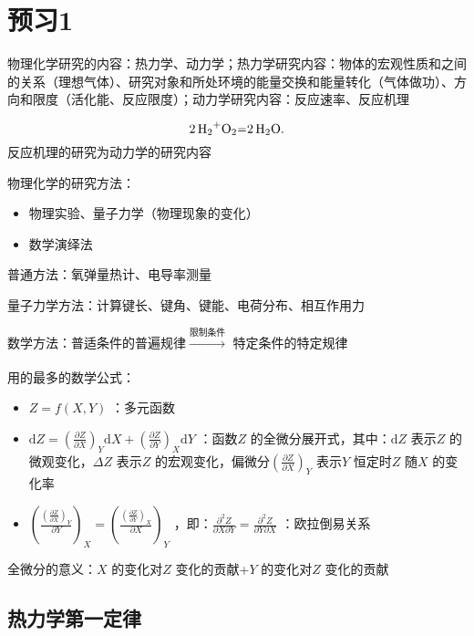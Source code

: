 \section*{预习1}%
\label{sec:预习1}
物理化学研究的内容：热力学、动力学；热力学研究内容：物体的宏观性质和之间的关系（理想气体）、研究对象和所处环境的能量交换和能量转化（气体做功）、方向和限度（活化能、反应限度）；动力学研究内容：反应速率、反应机理
\begin{eg}
    \[
        \ce{2H_2+O_2=2H_2O} 
    .\]
    反应机理的研究为动力学的研究内容
\end{eg}
物理化学的研究方法：
\begin{itemize}
    \item 物理实验、量子力学（物理现象的变化）
    \item 数学演绎法
    
\end{itemize}
\begin{eg}
    普通方法：氧弹量热计、电导率测量

    量子力学方法：计算键长、键角、键能、电荷分布、相互作用力

    数学方法：普适条件的普遍规律$\xrightarrow[]{\text{限制条件}}$ 特定条件的特定规律
\end{eg}
用的最多的数学公式：
\begin{itemize}
    \item $Z=f\left( X,Y \right)$ ：多元函数
    \item $\mathrm{d}Z=\left(\frac{\partial Z}{\partial X}\right)_{Y}\mathrm{d}X+\left(\frac{\partial Z}{\partial Y}\right)_{X}\mathrm{d}Y$ ：函数$Z$ 的全微分展开式，其中：$\mathrm{d}Z$ 表示$Z$ 的微观变化，$\Delta Z$ 表示$Z$ 的宏观变化，偏微分$\left(\frac{\partial Z}{\partial X}\right)_{Y}$ 表示$Y$ 恒定时$Z$ 随$X$ 的变化率
    \item $\left(\frac{\left(\frac{\partial Z}{\partial X}\right)_{Y}}{\partial Y}\right)_{X} = \left(\frac{\left(\frac{\partial Z}{\partial Y}\right)_{X}}{\partial X}\right)_{Y}$ ，即：$\frac{\partial^2 Z}{\partial X\partial Y} = \frac{\partial^2 Z}{\partial Y\partial X}$ ：欧拉倒易关系
\end{itemize}
\begin{notation}
    全微分的意义：$X$ 的变化对$Z$ 变化的贡献+$Y$ 的变化对$Z$ 变化的贡献
\end{notation}
\subsection*{热力学第一定律}%
\label{sub:热力学第一定律}
